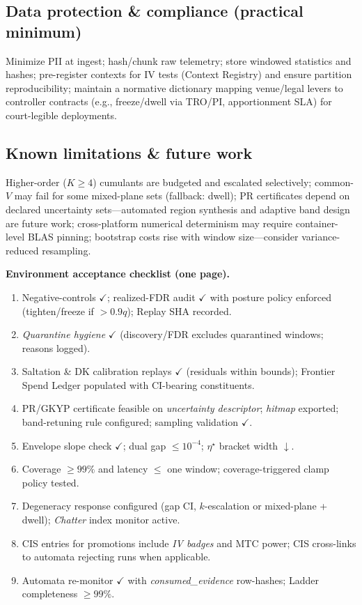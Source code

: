 \documentclass[10pt]{article}
\newcommand{\cutq}{q}
\begin{document}
\subsection*{Data protection \& compliance (practical minimum)}
Minimize PII at ingest; hash/chunk raw telemetry; store windowed statistics and hashes; pre-register contexts for IV tests (Context Registry) and ensure partition reproducibility; maintain a normative dictionary mapping venue/legal levers to controller contracts (e.g., freeze/dwell via TRO/PI, apportionment SLA) for court-legible deployments.

\subsection*{Known limitations \& future work}
Higher-order ($K{\ge}4$) cumulants are budgeted and escalated selectively; common-$V$ may fail for some mixed-plane sets (fallback: dwell); PR certificates depend on declared uncertainty sets—automated region synthesis and adaptive band design are future work; cross-platform numerical determinism may require container-level BLAS pinning; bootstrap costs rise with window size—consider variance-reduced resampling.

\begin{mdframed}
\textbf{Environment acceptance checklist (one page).}
\begin{enumerate}[leftmargin=*]
\item Negative-controls $\checkmark$; realized-FDR audit $\checkmark$ with posture policy enforced (tighten/freeze if $>0.9\cutq$); Replay SHA recorded.
\item \emph{Quarantine hygiene} $\checkmark$ (discovery/FDR excludes quarantined windows; reasons logged).
\item Saltation \& DK calibration replays $\checkmark$ (residuals within bounds); Frontier Spend Ledger populated with CI-bearing constituents.
\item PR/GKYP certificate feasible on \emph{uncertainty descriptor}; \emph{hitmap} exported; band-retuning rule configured; sampling validation $\checkmark$.
\item Envelope slope check $\checkmark$; dual gap $\le 10^{-4}$; $\eta^\star$ bracket width $\downarrow$.
\item Coverage $\ge 99\%$ and latency $\le$ one window; coverage-triggered clamp policy tested.
\item Degeneracy response configured (gap CI, $k$-escalation or mixed-plane + dwell); \emph{Chatter} index monitor active.
\item CIS entries for promotions include \emph{IV badges} and MTC power; CIS cross-links to automata rejecting runs when applicable.
\item Automata re-monitor $\checkmark$ with \emph{consumed\_evidence} row-hashes; Ladder completeness $\ge 99\%$.
\end{enumerate}
\end{mdframed}
\end{document}
